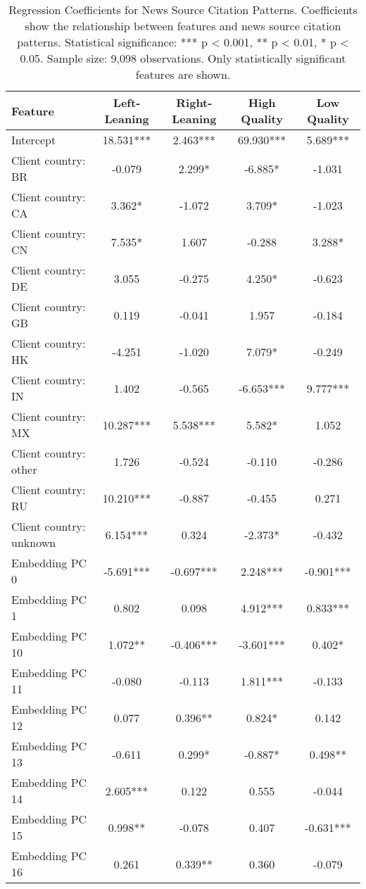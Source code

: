 \begin{table}[htbp]
\centering
\caption{Regression Coefficients for News Source Citation Patterns. Coefficients show the relationship between features and news source citation patterns. Statistical significance: *** p < 0.001, ** p < 0.01, * p < 0.05. Sample size: 9,098 observations. Only statistically significant features are shown.}
\label{tab:regression_coefficients}
\begin{tabular}{p{4cm}cccc}
\toprule
Feature & Left-Leaning & Right-Leaning & High Quality & Low Quality \\
\midrule
Intercept & 18.531*** & 2.463*** & 69.930*** & 5.689*** \\
Client country: BR & -0.079 & 2.299* & -6.885* & -1.031 \\
Client country: CA & 3.362* & -1.072 & 3.709* & -1.023 \\
Client country: CN & 7.535* & 1.607 & -0.288 & 3.288* \\
Client country: DE & 3.055 & -0.275 & 4.250* & -0.623 \\
Client country: GB & 0.119 & -0.041 & 1.957 & -0.184 \\
Client country: HK & -4.251 & -1.020 & 7.079* & -0.249 \\
Client country: IN & 1.402 & -0.565 & -6.653*** & 9.777*** \\
Client country: MX & 10.287*** & 5.538*** & 5.582* & 1.052 \\
Client country: other & 1.726 & -0.524 & -0.110 & -0.286 \\
Client country: RU & 10.210*** & -0.887 & -0.455 & 0.271 \\
Client country: unknown & 6.154*** & 0.324 & -2.373* & -0.432 \\
Embedding PC 0 & -5.691*** & -0.697*** & 2.248*** & -0.901*** \\
Embedding PC 1 & 0.802 & 0.098 & 4.912*** & 0.833*** \\
Embedding PC 10 & 1.072** & -0.406*** & -3.601*** & 0.402* \\
Embedding PC 11 & -0.080 & -0.113 & 1.811*** & -0.133 \\
Embedding PC 12 & 0.077 & 0.396** & 0.824* & 0.142 \\
Embedding PC 13 & -0.611 & 0.299* & -0.887* & 0.498** \\
Embedding PC 14 & 2.605*** & 0.122 & 0.555 & -0.044 \\
Embedding PC 15 & 0.998** & -0.078 & 0.407 & -0.631*** \\
Embedding PC 16 & 0.261 & 0.339** & 0.360 & -0.079 \\

\end{tabular}
\end{table}
